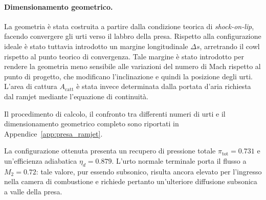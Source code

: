 \paragraph{Dimensionamento geometrico.}
La geometria è stata costruita a partire dalla condizione teorica di
\textit{shock-on-lip}, facendo convergere gli urti verso il labbro della
presa. Rispetto alla configurazione ideale è stato tuttavia introdotto un
margine longitudinale $\Delta s$, arretrando il cowl rispetto al punto
teorico di convergenza. Tale margine è stato introdotto per rendere la
geometria meno sensibile alle variazioni del numero di Mach rispetto al
punto di progetto, che modificano l'inclinazione e quindi la posizione
degli urti. L'area di cattura $A_{\mathrm{catt}}$ è stata invece
determinata dalla portata d'aria richiesta dal ramjet mediante
l'equazione di continuità.

 Il procedimento di calcolo,
il confronto tra differenti numeri di urti e il dimensionamento
geometrico completo sono riportati in Appendice~\ref{app:presa_ramjet}.

La configurazione ottenuta presenta un recupero di pressione totale
$\pi_{\mathrm{tot}}=0.731$ e un'efficienza adiabatica
$\eta_d=0.879$. L'urto normale terminale porta il flusso a
$M_2=0.72$: tale valore, pur essendo subsonico, risulta ancora elevato
per l'ingresso nella camera di combustione e richiede pertanto
un'ulteriore diffusione subsonica a valle della presa.







